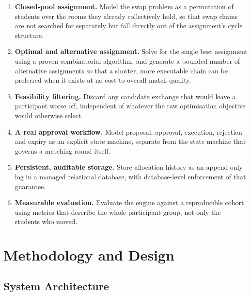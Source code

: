 \documentclass[11pt,a4paper]{report}
\begin{document}
\begin{enumerate}

    \item \textbf{Closed-pool assignment.} Model the swap problem as a
    permutation of students over the rooms they already collectively
    hold, so that swap chains are not searched for separately but fall
    directly out of the assignment's cycle structure.

    \item \textbf{Optimal and alternative assignment.} Solve for the
    single best assignment using a proven combinatorial algorithm,
    and generate a bounded number of alternative assignments so that
    a shorter, more executable chain can be preferred when it exists
    at no cost to overall match quality.

    \item \textbf{Feasibility filtering.} Discard any candidate
    exchange that would leave a participant worse off, independent of
    whatever the raw optimisation objective would otherwise select.

    \item \textbf{A real approval workflow.} Model proposal,
    approval, execution, rejection and expiry as an explicit state
    machine, separate from the state machine that governs a matching
    round itself.

    \item \textbf{Persistent, auditable storage.} Store allocation
    history as an append-only log in a managed relational database,
    with database-level enforcement of that guarantee.

    \item \textbf{Measurable evaluation.} Evaluate the engine against
    a reproducible cohort using metrics that describe the whole
    participant group, not only the students who moved.

\end{enumerate}


\chapter{Methodology and Design}

\section{System Architecture}
\end{document}
